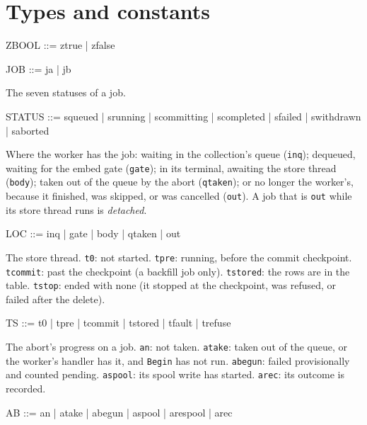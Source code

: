 \documentclass[a4paper,10pt,fleqn]{article}
\newcommand{\field}[1]{\texttt{#1}}
\begin{document}
\section{Types and constants}
\label{sec:types}

\begin{zed}
ZBOOL ::= ztrue | zfalse
\end{zed}

\begin{zed}
JOB ::= ja | jb
\end{zed}

The seven statuses of a job.

\begin{zed}
STATUS ::= squeued | srunning | scommitting | scompleted | sfailed
         | swithdrawn | saborted
\end{zed}

Where the worker has the job: waiting in the collection's queue
(\field{inq}); dequeued, waiting for the embed gate (\field{gate}); in its
terminal, awaiting the store thread (\field{body}); taken out of the queue by the
abort (\field{qtaken}); or no longer the worker's, because it finished, was
skipped, or was cancelled (\field{out}). A job that is \field{out} while its store
thread runs is \emph{detached}.

\begin{zed}
LOC ::= inq | gate | body | qtaken | out
\end{zed}

The store thread. \field{t0}: not started. \field{tpre}: running, before the
commit checkpoint. \field{tcommit}: past the checkpoint (a backfill job only).
\field{tstored}: the rows are in the table. \field{tstop}: ended with none (it
stopped at the checkpoint, was refused, or failed after the delete).

\begin{zed}
TS ::= t0 | tpre | tcommit | tstored | tfault | trefuse
\end{zed}

The abort's progress on a job. \field{an}: not taken. \field{atake}: taken out
of the queue, or the worker's handler has it, and \field{Begin} has not run.
\field{abegun}: failed provisionally and counted pending. \field{aspool}: its spool
write has started. \field{arec}: its outcome is recorded.

\begin{zed}
AB ::= an | atake | abegun | aspool | arespool | arec
\end{zed}
\end{document}
